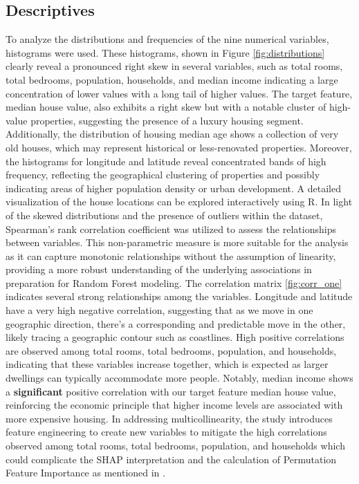 \documentclass[12pt]{article}
\begin{document}
\subsection{Descriptives}
To analyze the distributions and frequencies of the nine numerical variables, histograms were used. 
These histograms, shown in Figure \ref{fig:distributions} clearly reveal a pronounced right skew in several variables, such as total rooms, total bedrooms, population, households, and median income indicating a large concentration of lower values with a long tail of higher values. 
The target feature, median house value, also exhibits a right skew but with a notable cluster of high-value properties, suggesting the presence of a luxury housing segment.
Additionally, the distribution of housing median age shows a collection of very old houses, which may represent historical or less-renovated properties.
Moreover, the histograms for longitude and latitude reveal concentrated bands of high frequency, reflecting the geographical clustering of properties and possibly indicating areas of higher population density or urban development.
A detailed visualization of the house locations can be explored interactively using R.
In light of the skewed distributions and the presence of outliers within the dataset, Spearman's rank correlation coefficient was utilized to assess the relationships between variables. This non-parametric measure is more suitable for the analysis as it can capture monotonic relationships without the assumption of linearity, providing a more robust understanding of the underlying associations in preparation for Random Forest modeling.
The correlation matrix \ref{fig:corr_one} indicates several strong relationships among the variables. Longitude and latitude have a very high negative correlation, suggesting that as we move in one geographic direction, there’s a corresponding and predictable move in the other, likely tracing a geographic contour such as coastlines. High positive correlations are observed among total rooms, total bedrooms, population, and households, indicating that these variables increase together, which is expected as larger dwellings can typically accommodate more people.
Notably, median income shows a \textbf{significant} positive correlation with our target feature median house value, reinforcing the economic principle that higher income levels are associated with more expensive housing. 
In addressing multicollinearity, the study introduces feature engineering to create new variables to mitigate the high correlations observed among total rooms, total bedrooms, population, and households which could complicate the SHAP interpretation and the calculation of Permutation Feature Importance as mentioned in \cite[Section~11]{molnarSHAP}.
\end{document}
